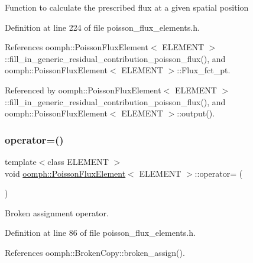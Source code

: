 Function to calculate the prescribed flux at a given spatial position 

Definition at line 224 of file poisson\+\_\+flux\+\_\+elements.\+h.



References oomph\+::\+Poisson\+Flux\+Element$<$ E\+L\+E\+M\+E\+N\+T $>$\+::fill\+\_\+in\+\_\+generic\+\_\+residual\+\_\+contribution\+\_\+poisson\+\_\+flux(), and oomph\+::\+Poisson\+Flux\+Element$<$ E\+L\+E\+M\+E\+N\+T $>$\+::\+Flux\+\_\+fct\+\_\+pt.



Referenced by oomph\+::\+Poisson\+Flux\+Element$<$ E\+L\+E\+M\+E\+N\+T $>$\+::fill\+\_\+in\+\_\+generic\+\_\+residual\+\_\+contribution\+\_\+poisson\+\_\+flux(), and oomph\+::\+Poisson\+Flux\+Element$<$ E\+L\+E\+M\+E\+N\+T $>$\+::output().

\mbox{\label{classoomph_1_1PoissonFluxElement_a036738c2637082cbc51a8362fab1e276}} 
\subsubsection{\texorpdfstring{operator=()}{operator=()}}
{\footnotesize\ttfamily template$<$class E\+L\+E\+M\+E\+NT $>$ \\
void \hyperlink{classoomph_1_1PoissonFluxElement}{oomph\+::\+Poisson\+Flux\+Element}$<$ E\+L\+E\+M\+E\+NT $>$\+::operator= (\begin{DoxyParamCaption}\item[{const \hyperlink{classoomph_1_1PoissonFluxElement}{Poisson\+Flux\+Element}$<$ E\+L\+E\+M\+E\+NT $>$ \&}]{ }\end{DoxyParamCaption})\hspace{0.3cm}{\ttfamily [inline]}}



Broken assignment operator. 



Definition at line 86 of file poisson\+\_\+flux\+\_\+elements.\+h.



References oomph\+::\+Broken\+Copy\+::broken\+\_\+assign().

\mbox{\label{classoomph_1_1PoissonFluxElement_ab8b5786144b8fed902bd7c47754675ba}} 
